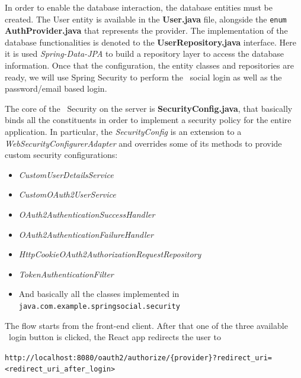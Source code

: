 In order to enable the database interaction, the database entities must be created. The User entity is available in the \textbf{User.java} file, alongside the \texttt{enum} \textbf{AuthProvider.java} that represents the provider. The implementation of the database functionalities is denoted to the \textbf{UserRepository.java} interface. Here it is used \textit{Spring-Data-JPA} to build a repository layer to access the database information.
Once that the configuration, the entity classes and repositories are ready, we will use Spring Security to perform the \oauth\ social login as well as the password/email based login.

The core of the \oauth\ Security on the server is \textbf{SecurityConfig.java}, that basically binds all the constituents in order to implement a security policy for the entire application. In particular, the \textit{SecurityConfig} is an extension to a  \textit{WebSecurityConfigurerAdapter} and overrides some of its methods to provide custom security configurations:

\begin{itemize}
    \item \textit{CustomUserDetailsService}
    \item \textit{CustomOAuth2UserService}
    \item \textit{OAuth2AuthenticationSuccessHandler}
    \item \textit{OAuth2AuthenticationFailureHandler}
    \item \textit{HttpCookieOAuth2AuthorizationRequestRepository}
    \item \textit{TokenAuthenticationFilter}
    \item And basically all the classes implemented in \texttt{java.com.example.springsocial.security}
\end{itemize}

\noindent The flow starts from the front-end client. After that one of the three available \oauth\ login button is clicked, the React app redirects the user to \\

\vspace{0.1cm}

\hypertarget{foo}{}

\texttt{\footnotesize{http://localhost:8080/oauth2/authorize/\{provider\}?redirect\_uri=<redirect\_uri\_after\_login>}} \\

\vspace{0.1cm}

